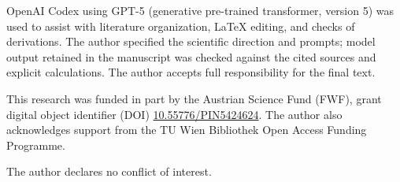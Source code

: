 \documentclass[
  aps,
  reprint,
  superscriptaddress,
  floatfix,
  nofootinbib,
  longbibliography
]{revtex4-2}
\begin{document}
\begin{acknowledgments}
OpenAI Codex using GPT-5 (generative pre-trained transformer, version 5) was
used to assist with literature organization, \LaTeX{}
editing, and checks of derivations.  The author specified the scientific
direction and prompts; model output retained in the manuscript was checked
against the cited sources and explicit calculations.  The author accepts full
responsibility for the final text.

This research was funded in part by the Austrian Science Fund (FWF), grant
digital object identifier (DOI)
\href{https://doi.org/10.55776/PIN5424624}{10.55776/PIN5424624}.
The author also acknowledges support from the TU Wien Bibliothek Open Access
Funding Programme.

The author declares no conflict of interest.
\end{acknowledgments}


\end{document}
